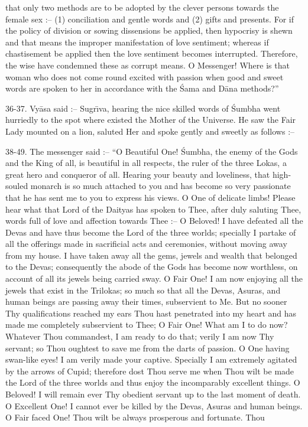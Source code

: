 that only two methods are to be adopted by the clever persons towards the female sex :-- (1) conciliation and gentle words and (2) gifts and presents. For if the policy of division or sowing dissensions be applied, then hypocrisy is shewn and that means the improper manifestation of love sentiment; whereas if chastisement be applied then the love sentiment becomes interrupted. Therefore, the wise have condemned these as corrupt means. O Messenger! Where is that woman who does not come round excited with passion when good and sweet words are spoken to her in accordance with the \'Sama and D\=ana methods?''

36-37. Vy\=asa said :-- Sugr\={\i}va, hearing the nice skilled words of \'Sumbha went hurriedly to the spot where existed the Mother of the Universe. He saw the Fair Lady mounted on a lion, saluted Her and spoke gently and sweetly as follows :--

38-49. The messenger said :-- ``O Beautiful One! \'Sumbha, the enemy of the Gods and the King of all, is beautiful in all respects, the ruler of the three Lokas, a great hero and conqueror of all. Hearing your beauty and loveliness, that high-souled monarch is so much attached to you and has become so very passionate that he has sent me to you to express his views. O One of delicate limbs! Please hear what that Lord of the Daityas has spoken to Thee, after duly saluting Thee, words full of love and affection towards Thee :-- O Beloved! I have defeated all the Devas and have thus become the Lord of the three worlds; specially I partake of all the offerings made in sacrificial acts and ceremonies, without moving away from my house. I have taken away all the gems, jewels and wealth that belonged to the Devas; consequently the abode of the Gods has become now worthless, on account of all its jewels being carried sway. O Fair One! I am now enjoying all the jewels that exist in the Trilokas; so much so that all the Devas, Asuras, and human beings are passing away their times, subservient to Me. But no sooner Thy qualifications reached my ears Thou hast penetrated into my heart and has made me completely subservient to Thee; O Fair One! What am I to do now? Whatever Thou commandest, I am ready to do that; verily I am now Thy servant; so Thou oughtest to save me from the darts of passion. O One having swan-like eyes! I am verily made your captive. Specially I am extremely agitated by the arrows of Cupid; therefore dost Thou serve me when Thou wilt be made the Lord of the three worlds and thus enjoy the incomparably excellent things. O Beloved! I will remain ever Thy obedient servant up to the last moment of death. O Excellent One! I cannot ever be killed by the Devas, Asuras and human beings. O Fair faced One! Thou wilt be always prosperous and fortunate. Thou

